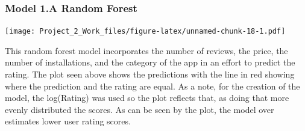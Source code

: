 \documentclass[]{article}
\newenvironment{Shaded}{\begin{snugshade}}{\end{snugshade}}
\newcommand{\KeywordTok}[1]{\textcolor[rgb]{0.13,0.29,0.53}{\textbf{{#1}}}}
\newcommand{\DataTypeTok}[1]{\textcolor[rgb]{0.13,0.29,0.53}{{#1}}}
\newcommand{\DecValTok}[1]{\textcolor[rgb]{0.00,0.00,0.81}{{#1}}}
\newcommand{\StringTok}[1]{\textcolor[rgb]{0.31,0.60,0.02}{{#1}}}
\newcommand{\NormalTok}[1]{{#1}}
\begin{document}
\subsubsection{Model 1.A Random Forest}\label{model-1.a-random-forest}

\begin{Shaded}
\end{Shaded}

\texttt{[image: Project\_2\_Work\_files/figure-latex/unnamed-chunk-18-1.pdf]}

This random forest model incorporates the number of reviews, the price,
the number of installations, and the category of the app in an effort to
predict the rating. The plot seen above shows the predictions with the
line in red showing where the prediction and the rating are equal. As a
note, for the creation of the model, the log(Rating) was used so the
plot reflects that, as doing that more evenly distributed the scores. As
can be seen by the plot, the model over estimates lower user rating
scores.

\begin{Shaded}
\end{Shaded}
\end{document}
